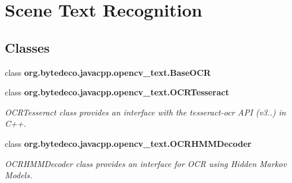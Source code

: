 \hypertarget{group__text__recognize}{}\section{Scene Text Recognition}
\label{group__text__recognize}
\subsection*{Classes}
\begin{DoxyCompactItemize}
\item 
class {\bfseries org.\+bytedeco.\+javacpp.\+opencv\+\_\+text.\+Base\+O\+CR}
\item 
class {\bfseries org.\+bytedeco.\+javacpp.\+opencv\+\_\+text.\+O\+C\+R\+Tesseract}
\begin{DoxyCompactList}\small\item\em O\+C\+R\+Tesseract class provides an interface with the tesseract-\/ocr A\+PI (v3..) in C++. \end{DoxyCompactList}\item 
class {\bfseries org.\+bytedeco.\+javacpp.\+opencv\+\_\+text.\+O\+C\+R\+H\+M\+M\+Decoder}
\begin{DoxyCompactList}\small\item\em O\+C\+R\+H\+M\+M\+Decoder class provides an interface for O\+CR using Hidden Markov Models. \end{DoxyCompactList}\end{DoxyCompactItemize}
